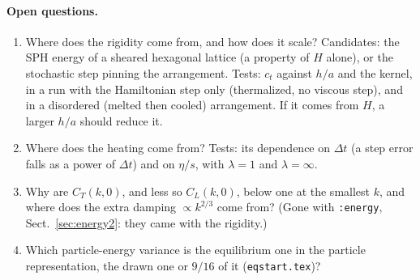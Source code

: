 \documentclass[11pt,aps,preprint,nofootinbib,superscriptaddress,tightenlines]{revtex4-2}
\def\Sect#1{Sect.~\ref{#1}}
\let\oldparagraph\paragraph
\renewcommand{\paragraph}{\par\bigskip\oldparagraph}
\begin{document}
\paragraph{Open questions.}
\begin{enumerate}
\item Where does the rigidity come from, and how does it scale?  Candidates: the SPH
  energy of a sheared hexagonal lattice (a property of $H$ alone), or the stochastic step
  pinning the arrangement.  Tests: $c_t$ against $h/a$ and the kernel, in a run with the
  Hamiltonian step only (thermalized, no viscous step), and in a disordered (melted then
  cooled) arrangement.  If it comes from $H$, a larger $h/a$ should reduce it.
\item Where does the heating come from?  Tests: its dependence on $\Delta t$ (a step error
  falls as a power of $\Delta t$) and on $\eta/s$, with $\lambda=1$ and $\lambda=\infty$.
\item Why are $C_T(k,0)$, and less so $C_L(k,0)$, below one at the smallest $k$, and where does
  the extra damping $\propto k^{2/3}$ come from?  (Gone with \texttt{:energy}, \Sect{sec:energy2}: they came with the rigidity.)
\item Which particle-energy variance is the equilibrium one in the particle representation,
  the drawn one or $9/16$ of it (\texttt{eqstart.tex})?
\end{enumerate}
\end{document}
